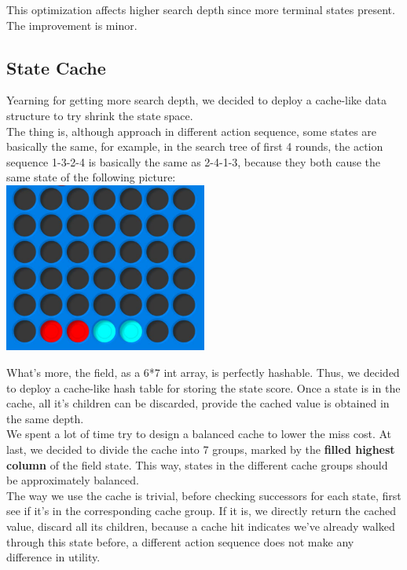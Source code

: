 \documentclass[12pt,a4paper]{article}
\begin{document}
	This optimization affects higher search depth since more terminal states present. The improvement is minor.
	\subsection{State Cache}
	Yearning for getting more search depth, we decided to deploy a cache-like data structure to try shrink the state space.\\
	
	The thing is, although approach in different action sequence, some states are basically the same, for example, in the search tree of first 4 rounds, the action sequence 1-3-2-4 is basically the same as 2-4-1-3, because they both cause the same state of the following picture:
	\\
	
	{\centering\includegraphics[width=0.5\textwidth]{Field}~\\}
	
	What's more, the field, as a 6*7 int array, is perfectly hashable. Thus, we decided to deploy a cache-like hash table for storing the state score. Once a state is in the cache, all it's children can be discarded, provide the cached value is obtained in the same depth.\\
	
	We spent a lot of time try to design a balanced cache to lower the miss cost. At last, we decided to divide the cache into 7 groups, marked by the \textbf{filled highest column} of the field state. This way, states in the different cache groups should be approximately balanced.\\
	
	The way we use the cache is trivial, before checking successors for each state, first see if it's in the corresponding cache group. If it is, we directly return the cached value, discard all its children, because a cache hit indicates we've already walked through this state before, a different action sequence does not make any difference in utility.\\
	
\end{document}
